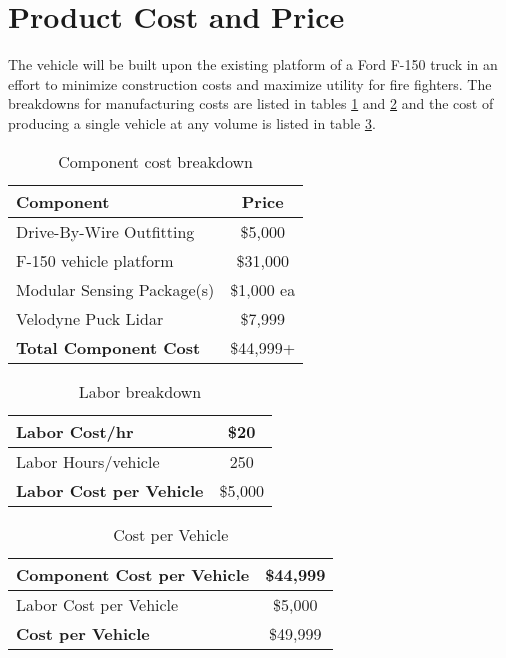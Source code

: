 \section{Product Cost and Price}

The vehicle will be built upon the existing platform of a Ford F-150 truck in an effort to minimize construction costs and maximize utility for fire fighters. The breakdowns for manufacturing costs are listed in tables \ref{table:ComponentCosts} and \ref{table:LaborCost} and the cost of producing a single vehicle at any volume is listed in table \ref{table:VehicleCost}.

\begin{table}[h!]
	\begin{center}
		\begin{tabular}{| l | c |}
			\hline
			\textbf{Component} & \textbf{Price} \\ \hline
			Drive-By-Wire Outfitting & \$5,000 \\ \hline
			F-150 vehicle platform & \$31,000 \\ \hline
			Modular Sensing Package(s) & \$1,000 ea \\ \hline
			Velodyne Puck Lidar & \$7,999 \\ \hline \hline
			\textbf{Total Component Cost} & \$44,999+ \\ \hline
		\end{tabular}
	\end{center}
	\caption{Component cost breakdown}
	\label{table:ComponentCosts}
\end{table}

\begin{table}[h!]
	\begin{center}
		\begin{tabular}{| l | c |}
			\hline
			Labor Cost/hr & \$20 \\ \hline
			Labor Hours/vehicle & 250 \\ \hline \hline
			\textbf{Labor Cost per Vehicle} & \$5,000 \\ \hline
		\end{tabular}
	\end{center}
	\caption{Labor breakdown}
	\label{table:LaborCost}
\end{table}

\begin{table}[h!]
	\begin{center}
		\begin{tabular}{| l | c |}
			\hline
			Component Cost per Vehicle & \$44,999 \\ \hline
			Labor Cost per Vehicle & \$5,000 \\ \hline \hline
			\textbf{Cost per Vehicle} & \$49,999 \\ \hline
		\end{tabular}
	\end{center}
	\caption{Cost per Vehicle}
	\label{table:VehicleCost}
\end{table}

